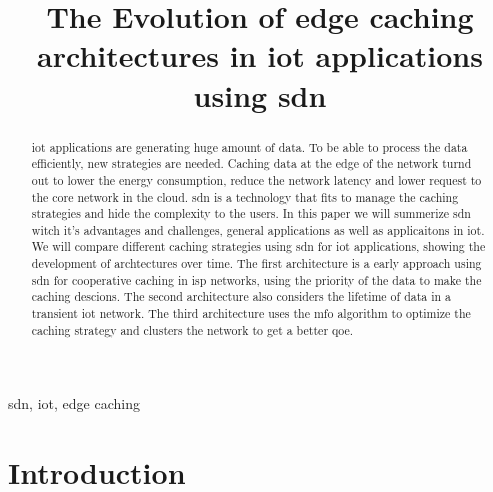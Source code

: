 \documentclass[conference]{IEEEtran}
\begin{document}
	\title{The Evolution of edge caching architectures in \acs{iot} applications using \ac{sdn}}


	\author{
		}

	\maketitle

	\begin{abstract}
	\ac{iot} applications are generating huge amount of data. To be able to process the data efficiently, new strategies are needed. Caching data at the edge of the network turnd out to lower the energy consumption, reduce the network latency and lower request to the core network in the cloud. \ac{sdn} is a technology that fits to manage the caching strategies and hide the complexity to the users. In this paper we will summerize \ac{sdn} witch it's advantages and challenges, general applications as well as applicaitons in \ac{iot}. We will compare different caching strategies using \ac{sdn} for \ac{iot} applications, showing the development of archtectures over time. The first architecture is a early approach using \ac{sdn} for cooperative caching in \ac{isp} networks, using the priority of the data to make the caching descions. The second architecture also considers the lifetime of data in a transient \ac{iot} network. The third architecture uses the \ac{mfo} algorithm to optimize the caching strategy and clusters the network to get a better \ac{qoe}.
	\end{abstract}

	\begin{IEEEkeywords}
	\ac{sdn}, \ac{iot}, edge caching
	\end{IEEEkeywords}

	\IEEEpeerreviewmaketitle

	\section{Introduction}
	\label{sec:introduction}
\end{document}
